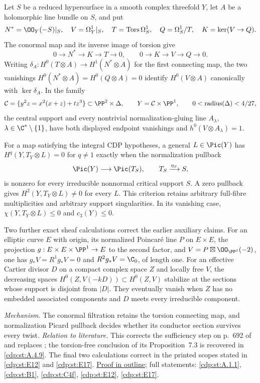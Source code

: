 \hypertarget{main-II-A}{}
\begin{maintheorem}
\hypertarget{tag-03K2}{}\label{series:II:A}

Let $S$ be a reduced hypersurface in a smooth complex threefold $Y$,
let $A$ be a holomorphic line bundle on $S$, and put
\[
 N^*=\OO_Y(-S)|_S,\quad V=\Omega_Y^1|_S,\quad
 T=\operatorname{Tors}\Omega_S^1,\quad Q=\Omega_S^1/T,
 \quad K=\ker(V\to Q).
\]
The conormal map and its inverse image of torsion give
\[
 0\to N^*\to K\to T\to0,
 \qquad 0\to K\to V\to Q\to0.
\]
Writing $\delta_A:H^0(T\otimes A)\to H^1(N^*\otimes A)$
for the first connecting map, the two vanishings
$H^0(N^*\otimes A)=H^0(Q\otimes A)=0$ identify
$H^0(V\otimes A)$ canonically with $\ker\delta_A$.
In the family
\[
 \mathcal C=\{y^2z=x^2(x+z)+tz^3\}\subset\PP^2\times\Delta,
 \qquad Y=\mathcal C\times\PP^1,
 \qquad 0<\operatorname{radius}(\Delta)<4/27,
\]
the central support and every nontrivial normalization-gluing line
$A_\lambda$, $\lambda\in\C^*\setminus\{1\}$, have both displayed
endpoint vanishings and $h^0(V\otimes A_\lambda)=1$.

For a map satisfying the integral CDP hypotheses, a general
$L\in\Pic(Y)$ has $H^q(Y,T_Y\otimes L)=0$ for $q\ne1$
exactly when the normalization pullback
\[
 \Pic(Y)\longrightarrow\Pic(T_S),\qquad
 T_S\xrightarrow{\eta_S}S,
\]
is nonzero for every irreducible nonnormal critical support $S$.
A zero pullback gives $H^2(Y,T_Y\otimes L)\ne0$ for every $L$.
This criterion retains arbitrary full-fibre multiplicities and
arbitrary support singularities. In its vanishing case,
$\chi(Y,T_Y\otimes L)\le0$ and $c_3(Y)\le0$.

Two further exact sheaf calculations correct the earlier auxiliary
claims. For an elliptic curve $E$ with origin, its normalized
Poincar\'e line $P$ on $E\times E$, the projection
$g:E\times E\times\PP^1\to E$ to the second factor, and
$V=P\boxtimes\OO_{\PP^1}(-2)$, one has
$g_*V=R^1g_*V=0$ and $R^2g_*V=\C_0$, of length one.
For an effective Cartier divisor $D$ on a compact complex space
$Z$ and locally free $V$, the decreasing spaces
$H^0(Z,V(-kD))\subset H^0(Z,V)$ stabilize at the sections whose
support is disjoint from $|D|$. They eventually vanish when $Z$
has no embedded associated components and $D$ meets every
irreducible component.

\end{maintheorem}

\textit{Mechanism.} The conormal filtration retains the torsion
connecting map, and normalization Picard pullback decides whether
its conductor section survives every twist.
\textit{Relation to literature.} This corrects the sufficiency step
on p.~692 of \cite{CDP2020} and replaces
\cite[Theorem~2.2]{CDP2020}; the torsion-free conclusion of its
Proposition~7.3 is recovered in \ref{cdp:st:A.4.9}.
The final two calculations correct \cite[Lemma~1.5 and
Proposition~1.1]{CDP98} in the printed scopes stated in
\ref{cdp:st:E12} and \ref{cdp:st:E17}.
\hyperlink{outline-II-A}{Proof in outline}; full statements:
\ref{cdp:st:A.1.1}, \ref{cdp:st:B1}, \ref{cdp:st:C4f},
\ref{cdp:st:E12}, \ref{cdp:st:E17}.

